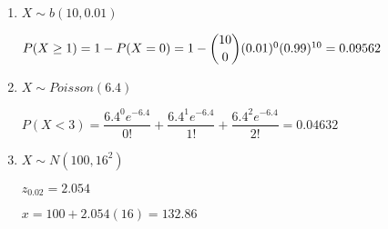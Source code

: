 \documentclass{article}
\begin{document}
\begin{enumerate}
     \item
      $X \sim b(10, 0.01)$
      
      $P(X \ge 1) = 1 - P(X = 0) = 1 - \dbinom{10}{0}(0.01)^0(0.99)^{10} = 0.09562$
     
     \item
      $X \sim Poisson(6.4)$
      
      $P(X < 3) = \dfrac{6.4^{0}e^{-6.4}}{0!} + \dfrac{6.4^{1}e^{-6.4}}{1!} 
	+ \dfrac{6.4^{2}e^{-6.4}}{2!} = 0.04632$
     
     \item
      $X \sim N(100,16^2)$
      
      $z_{0.02} = 2.054$
      
      $x = 100 + 2.054(16) = 132.86$
    \end{enumerate}
\end{document}
